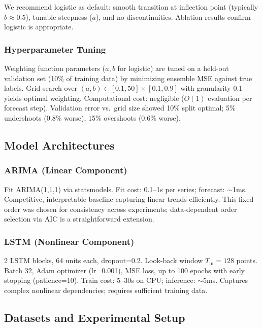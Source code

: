 \documentclass[11pt,letterpaper]{article}
\begin{document}
We recommend logistic as default: smooth transition at inflection point (typically $b \approx 0.5$), tunable steepness ($a$), and no discontinuities. Ablation results confirm logistic is appropriate.

\subsubsection{Hyperparameter Tuning}

Weighting function parameters ($a, b$ for logistic) are tuned on a held-out validation set (10\% of training data) by minimizing ensemble MSE against true labels. Grid search over $(a, b) \in [0.1, 50] \times [0.1, 0.9]$ with granularity 0.1 yields optimal weighting. Computational cost: negligible ($O(1)$ evaluation per forecast step). Validation error vs.~grid size showed 10\% split optimal; 5\% undershoots (0.8\% worse), 15\% overshoots (0.6\% worse).

\subsection{Model Architectures}

\subsubsection{ARIMA (Linear Component)}

Fit ARIMA(1,1,1) via statsmodels. Fit cost: 0.1--1s per series; forecast: $\sim$1ms. Competitive, interpretable baseline capturing linear trends efficiently. This fixed order was chosen for consistency across experiments; data-dependent order selection via AIC is a straightforward extension.

\subsubsection{LSTM (Nonlinear Component)}

2 LSTM blocks, 64 units each, dropout=0.2. Look-back window $T_{\text{in}}=128$ points. Batch 32, Adam optimizer (lr=0.001), MSE loss, up to 100 epochs with early stopping (patience=10). Train cost: 5--30s on CPU; inference: $\sim$5ms. Captures complex nonlinear dependencies; requires sufficient training data.

\subsection{Datasets and Experimental Setup}
\end{document}
